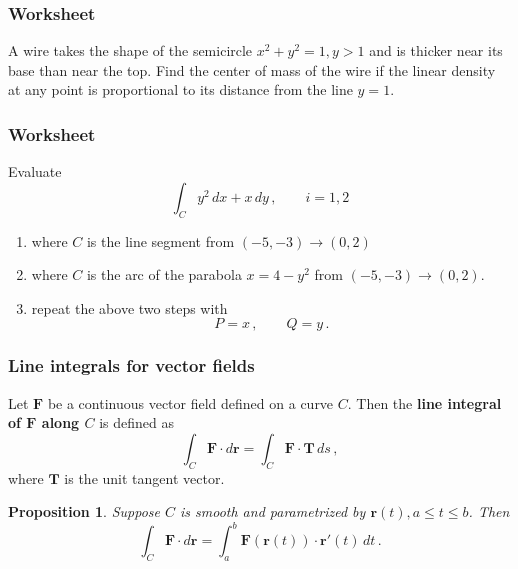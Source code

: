\documentclass[aspectratio=169]{beamer}
\newtheorem*{proposition}{Proposition}
\begin{document}
\begin{frame}
    \frametitle{Worksheet}
    A wire takes the shape of the semicircle $x^2 + y^2 = 1, y>1$ and is thicker near its base than near the top. Find the center of mass of the wire if the linear density at any point is proportional to its distance from the line $y = 1$.
\end{frame}

\begin{frame}
    \frametitle{Worksheet}
    Evaluate
    \begin{equation*}
        \int_{C} y^2 \, dx + x\, dy \,, \qquad i = 1,2
    \end{equation*}
    \begin{enumerate}
        \item where \(C\) is the line segment from \((-5,-3) \to (0,2)\) 
        \item where \(C\) is the arc of the parabola \(x = 4-y^2\) from \((-5,-3) \to (0,2)\).
        \item repeat the above two steps with 
            \begin{equation*}
                P = x\,, \qquad Q = y \,.
            \end{equation*}
    \end{enumerate}
\end{frame}



\begin{frame}
    \frametitle{Line integrals for vector fields}
    \begin{definition}
    Let \(\mathbf{F}\) be a continuous vector field defined
    on a curve \(C\).
    Then the \textbf{line integral of \(\mathbf{F}\) along \(C\)} is defined as
    \begin{equation*}
        \int_C \mathbf{F} \cdot d \mathbf{r} 
        = \int_C \mathbf{F}\cdot \mathbf{T} \, ds \,,
    \end{equation*}
    where \(\mathbf{T}\) is the unit tangent vector.
    \end{definition}
\end{frame}


\begin{frame}
\begin{proposition}
Suppose \(C\) is smooth and
parametrized by \(\mathbf{r}(t), a \leq t \leq b\).
Then
\begin{equation*}
    \int_C \mathbf{F} \cdot d \mathbf{r} 
    = \int_a^b \mathbf{F}(\mathbf{r}(t)) \cdot \mathbf{r}'(t) \, dt\,.
\end{equation*}
\end{proposition}
\end{frame}
\end{document}
